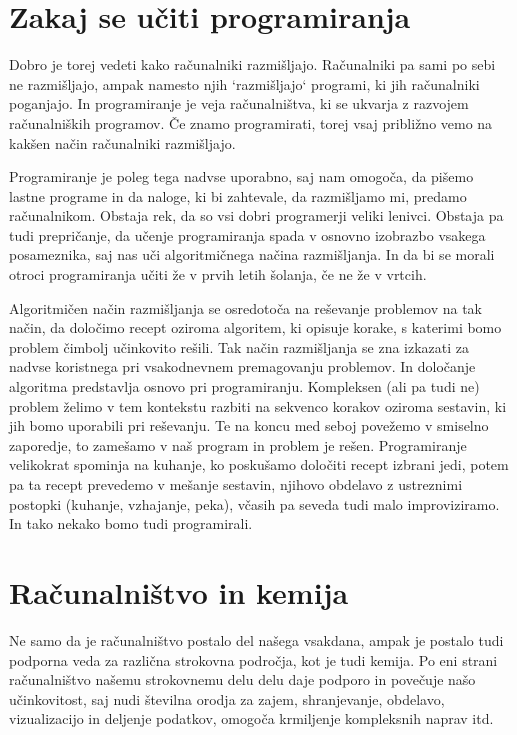 \section{Zakaj se učiti programiranja}

Dobro je torej vedeti kako računalniki razmišljajo. Računalniki pa sami po sebi ne razmišljajo, ampak namesto njih `razmišljajo` programi, ki jih računalniki poganjajo. In programiranje je veja računalništva, ki se ukvarja z razvojem računalniških programov. Če znamo programirati, torej vsaj približno vemo na kakšen način računalniki razmišljajo.

Programiranje je poleg tega nadvse uporabno, saj nam omogoča, da pišemo lastne programe in da naloge, ki bi zahtevale, da razmišljamo mi, predamo računalnikom. Obstaja rek, da so vsi dobri programerji veliki lenivci. Obstaja pa tudi prepričanje, da učenje programiranja spada v osnovno izobrazbo vsakega posameznika, saj nas uči algoritmičnega načina razmišljanja. In da bi se morali otroci programiranja učiti že v prvih letih šolanja, če ne že v vrtcih.

Algoritmičen način razmišljanja se osredotoča na reševanje problemov na tak način, da določimo recept oziroma algoritem, ki opisuje korake, s katerimi bomo problem čimbolj učinkovito rešili. Tak način razmišljanja se zna izkazati za nadvse koristnega pri vsakodnevnem premagovanju problemov. In določanje algoritma predstavlja osnovo pri programiranju. Kompleksen (ali pa tudi ne) problem želimo v tem kontekstu razbiti na sekvenco korakov oziroma sestavin, ki jih bomo uporabili pri reševanju. Te na koncu med seboj povežemo v smiselno zaporedje, to zamešamo v naš program in problem je rešen. Programiranje velikokrat spominja na kuhanje, ko poskušamo določiti recept izbrani jedi, potem pa ta recept prevedemo v mešanje sestavin, njihovo obdelavo z ustreznimi postopki (kuhanje, vzhajanje, peka), včasih pa seveda tudi malo improviziramo. In tako nekako bomo tudi programirali. 

\section{Računalništvo in kemija}

Ne samo da je računalništvo postalo del našega vsakdana, ampak je postalo tudi podporna veda za različna strokovna področja, kot je tudi kemija. Po eni strani računalništvo našemu strokovnemu delu delu daje podporo in povečuje našo učinkovitost, saj nudi številna orodja za zajem, shranjevanje, obdelavo, vizualizacijo in deljenje podatkov, omogoča krmiljenje kompleksnih naprav itd. 

